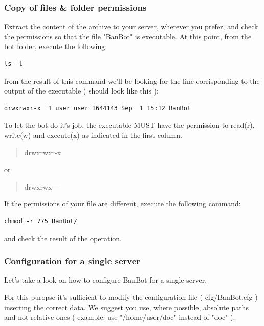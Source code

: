 \documentclass[a4paper]{article}
\begin{document}
\subsubsection{Copy of files \& folder permissions}
Extract the content of the archive to your server, wherever you prefer, and check the permissions so that the file "BanBot" is executable. At this point, from the
bot folder, execute the following:
\begin{lstlisting}
ls -l
\end{lstlisting}
from the result of this command we'll be looking for the line corrisponding to the output of the executable ( should look like this ):
\begin{lstlisting}
drwxrwxr-x  1 user user 1644143 Sep  1 15:12 BanBot
\end{lstlisting}
To let the bot do it's job, the executable MUST have the permission to read(r), write(w) and execute(x) as indicated in the first column.
\begin{quote}
drwxrwxr-x
\end{quote}
or
\begin{quote}
drwxrwx---
\end{quote}
If the permissions of your file are different, execute the following command:
\begin{lstlisting}
chmod -r 775 BanBot/
\end{lstlisting}
and check the result of the operation.

\subsubsection {Configuration for a single server}
\label{eng:singleServer}
Let's take a look on how to configure BanBot for a single server.

For this puropse it's sufficient to modify the configuration file ( cfg/BanBot.cfg ) inserting the correct data. We suggest you use, where possible, absolute paths
and not relative ones ( example: use "/home/user/doc" instead of "doc" ).
\end{document}
